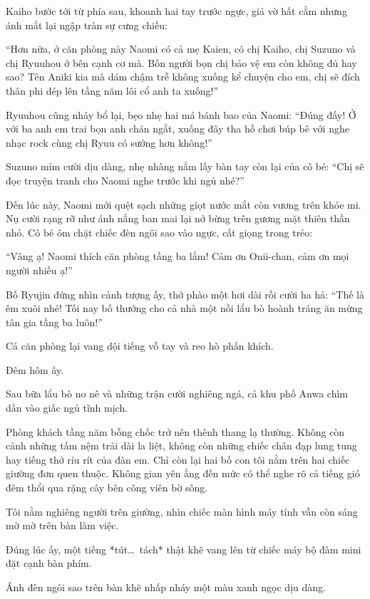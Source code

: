 \documentclass[../main.tex]{subfiles}
\begin{document}
Kaiho bước tới từ phía sau, khoanh hai tay trước ngực, giả vờ hất cằm nhưng ánh mắt lại ngập tràn sự cưng chiều:

``Hơn nữa, ở căn phòng này Naomi có cả mẹ Kaien, có chị Kaiho, chị Suzuno và chị Ryuuhou ở bên cạnh cơ mà. Bốn người bọn chị bảo vệ em còn không đủ hay sao? Tên Aniki kia mà dám chậm trễ không xuống kể chuyện cho em, chị sẽ đích thân phi dép lên tầng năm lôi cổ anh ta xuống!''

Ryuuhou cũng nhảy bổ lại, bẹo nhẹ hai má bánh bao của Naomi: ``Đúng đấy! Ở với ba anh em trai bọn anh chán ngắt, xuống đây tha hồ chơi búp bê với nghe nhạc rock cùng chị Ryuu có sướng hơn không!''

Suzuno mỉm cười dịu dàng, nhẹ nhàng nắm lấy bàn tay còn lại của cô bé: ``Chị sẽ đọc truyện tranh cho Naomi nghe trước khi ngủ nhé?''

Đến lúc này, Naomi mới quệt sạch những giọt nước mắt còn vương trên khóe mi. Nụ cười rạng rỡ như ánh nắng ban mai lại nở bừng trên gương mặt thiên thần nhỏ. Cô bé ôm chặt chiếc đèn ngôi sao vào ngực, cất giọng trong trẻo:

``Vâng ạ! Naomi thích căn phòng tầng ba lắm! Cảm ơn Onii-chan, cảm ơn mọi người nhiều ạ!''

Bố Ryujin đứng nhìn cảnh tượng ấy, thở phào một hơi dài rồi cười ha hả: ``Thế là êm xuôi nhé! Tối nay bố thưởng cho cả nhà một nồi lẩu bò hoành tráng ăn mừng tân gia tầng ba luôn!''

Cả căn phòng lại vang dội tiếng vỗ tay và reo hò phấn khích.

\ct

Đêm hôm ấy.

Sau bữa lẩu bò no nê và những trận cười nghiêng ngả, cả khu phố Anwa chìm dần vào giấc ngủ tĩnh mịch.

Phòng khách tầng năm bỗng chốc trở nên thênh thang lạ thường. Không còn cảnh những tấm nệm trải dài la liệt, không còn những chiếc chân đạp lung tung hay tiếng thở ríu rít của đàn em. Chỉ còn lại hai bố con tôi nằm trên hai chiếc giường đơn quen thuộc. Không gian yên ắng đến mức có thể nghe rõ cả tiếng gió đêm thổi qua rặng cây bên công viên bờ sông.

Tôi nằm nghiêng người trên giường, nhìn chiếc màn hình máy tính vẫn còn sáng mờ mờ trên bàn làm việc.

Đúng lúc ấy, một tiếng *tút\dots\ tách* thật khẽ vang lên từ chiếc máy bộ đàm mini đặt cạnh bàn phím.

Ánh đèn ngôi sao trên bàn khẽ nhấp nháy một màu xanh ngọc dịu dàng.
\end{document}
